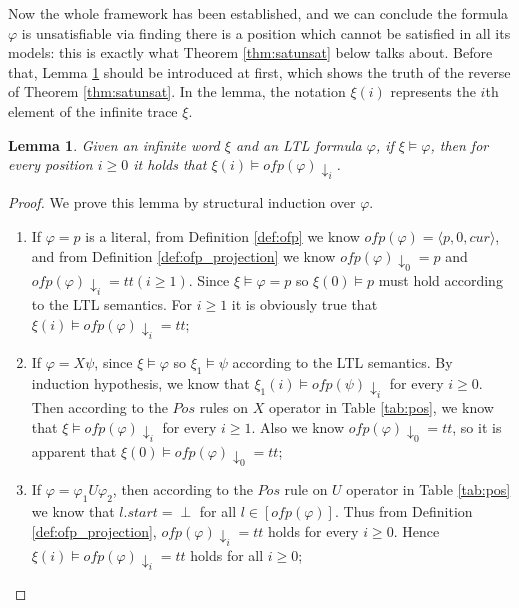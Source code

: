 \documentclass[conference]{IEEEtran}
\newtheorem{lemma}{Lemma}
\newtheorem{proof}{IEEEproof}
\def\phi{\varphi}
\def\tt{\mathit{tt}}
\def\ofp#1{\mathit{ofp}(#1)}
\def\nondeter{\perp}
\def\cur{\mathit{cur}}
\begin{document}
Now the whole framework has been established, and we can conclude the formula $\phi$ is 
unsatisfiable via finding there is a position which cannot be satisfied in all its models: this is exactly what 
Theorem \ref{thm:satunsat} below talks about. Before that, Lemma \ref{lem:reduction_3}  should be introduced at first, which shows the truth of the reverse of Theorem \ref{thm:satunsat}. In the lemma, the notation $\xi(i)$ represents the $i$th 
element of the infinite trace $\xi$.

\begin{lemma}\label{lem:reduction_3}
    Given an infinite word $\xi$ and an LTL formula $\phi$, if $\xi\models\phi$, then 
    for every position $i\ge 0$ it holds that $\xi(i)\models \ofp{\phi}\!\downarrow_i$.
\end{lemma}
\begin{proof}
  We prove this lemma by structural induction over $\phi$. 
  \iffalse
  The proof is trivial for 
  the cases when the type of $\phi$ is the 
  literal, next, until, release, or $\wedge$ formula, so we here focus on the cases when 
  it is Global (G) and $\vee$:
  \fi
  \begin{enumerate}
  
    \item If $\phi=p$ is a literal, from Definition \ref{def:ofp} we know 
    $\ofp{\phi} = \langle p, 0, \cur\rangle$, and from Definition \ref{def:ofp_projection} 
    we know $\ofp{\phi}\!\downarrow_0=p$ and 
    $\ofp{\phi}\!\downarrow_i=\tt (i\geq 1)$. Since $\xi\models \phi=p$ so $\xi(0)\models p$ must 
    hold according to the LTL semantics. For $i\geq 1$ it is obviously true that 
    $\xi(i)\models \ofp{\phi}\!\downarrow_i=\tt$; 
    
    \item If $\phi=X\psi$, since $\xi\models\phi$ so $\xi_1\models\psi$ according to the 
    LTL semantics. By induction hypothesis, we know that $\xi_1 (i)\models \ofp{\psi}\!\downarrow_i$ 
    for every $i\geq 0$. Then according to the $Pos$ rules on $X$ operator in Table \ref{tab:pos}, we 
    know that $\xi\models \ofp{\phi}\!\downarrow_i$ for every $i\geq 1$. Also we know 
    $\ofp{\phi}\!\downarrow_0=\tt$, so it is apparent that $\xi(0)\models \ofp{\phi}\!\downarrow_0=\tt$;
    
    \item If $\phi=\phi_1 U \phi_2$, then according to the $Pos$ rule on $U$ operator in Table 
    \ref{tab:pos} we know that $l.start=
\nondeter$ for all $l\in [\ofp{\phi}]$. Thus from Definition 
    \ref{def:ofp_projection}, $ofp(\phi)\!\downarrow_i=\tt$ holds 
    for every $i\geq 0$. Hence $\xi(i)\models \ofp{\phi}\!\downarrow_i=\tt$ holds for all $i\geq 0$;
    

\end{enumerate}
\end{proof}
\end{document}
